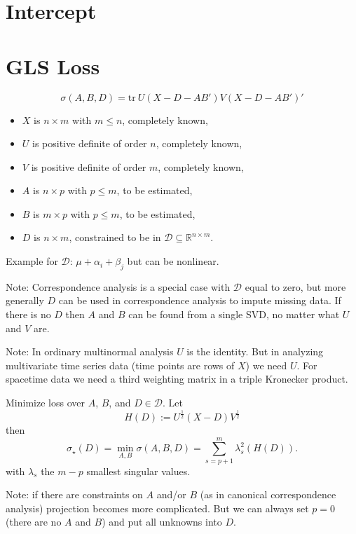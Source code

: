 \documentclass[
  12pt,
  letterpaper,
  DIV=11,
  numbers=noendperiod]{scrartcl}
\providecommand{\tightlist}{%
  \setlength{\itemsep}{0pt}\setlength{\parskip}{0pt}}
\begin{document}
\section{Intercept}\label{intercept}

\section{GLS Loss}\label{gls-loss}

\[
\sigma(A,B,D)=\text{tr}\ U(X-D-AB')V(X-D-AB')'
\]

\begin{itemize}
\tightlist
\item
  \(X\) is \(n\times m\) with \(m\leq n\), completely known,
\item
  \(U\) is positive definite of order \(n\), completely known,
\item
  \(V\) is positive definite of order \(m\), completely known,
\item
  \(A\) is \(n\times p\) with \(p\leq m\), to be estimated,
\item
  \(B\) is \(m\times p\) with \(p\leq m\), to be estimated,
\item
  \(D\) is \(n\times m\), constrained to be in
  \(\mathcal{D}\subseteq\mathbb{R}^{n\times m}\).
\end{itemize}

Example for \(\mathcal{D}\): \(\mu+\alpha_i+\beta_j\) but can be
nonlinear.

Note: Correspondence analysis is a special case with \(\mathcal{D}\)
equal to zero, but more generally \(D\) can be used in correspondence
analysis to impute missing data. If there is no \(D\) then \(A\) and
\(B\) can be found from a single SVD, no matter what \(U\) and \(V\)
are.

Note: In ordinary multinormal analysis \(U\) is the identity. But in
analyzing multivariate time series data (time points are rows of \(X\))
we need \(U\). For spacetime data we need a third weighting matrix in a
triple Kronecker product.

Minimize loss over \(A\), \(B\), and \(D\in\mathcal{D}\). Let \[
H(D):=U^\frac12(X-D)V^\frac12
\] then \[
\sigma_\star(D)=\min_{A,B}\sigma(A,B,D)=\sum_{s=p+1}^m\lambda_s^2(H(D)).
\] with \(\lambda_s\) the \(m-p\) smallest singular values.

Note: if there are constraints on \(A\) and/or \(B\) (as in canonical
correspondence analysis) projection becomes more complicated. But we can
always set \(p=0\) (there are no \(A\) and \(B\)) and put all unknowns
into \(D\).
\end{document}
